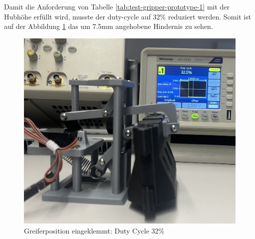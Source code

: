 \newpage

Damit die Anforderung von Tabelle \ref{tab:test-gripper-prototype-1} mit der Hubhöhe erfüllt wird, musste der \gls{duty-cycle} auf 32\% reduziert werden. Somit ist auf der Abbildung \ref{fig: Greiferposition angehoben: Duty Cycle 32} das um 7.5mm angehobene Hindernis zu sehen.

\begin{figure}[H]
    \centering
    \includegraphics[width=0.8\linewidth]{img/ServoHindernisAngehoben.jpeg}
    \caption{Greiferposition eingeklemmt: Duty Cycle 32\%}
    \label{fig: Greiferposition angehoben: Duty Cycle 32}
\end{figure}